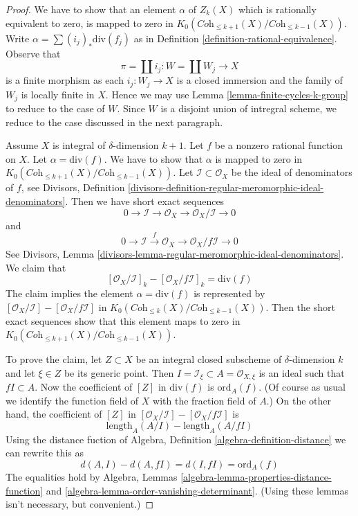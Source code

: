 \begin{proof}
We have to show that an element $\alpha$ of $Z_k(X)$ which is rationally
equivalent to zero, is mapped to zero in
$K_0(\textit{Coh}_{\leq k + 1}(X)/\textit{Coh}_{\leq k - 1}(X))$.
Write $\alpha = \sum (i_j)_*\text{div}(f_j)$ as in
Definition \ref{definition-rational-equivalence}.
Observe that
$$
\pi = \coprod i_j : W = \coprod W_j \longrightarrow X
$$
is a finite morphism as each $i_j : W_j \to X$ is a closed immersion
and the family of $W_j$ is locally finite in $X$. Hence we may use
Lemma \ref{lemma-finite-cycles-k-group} to reduce to the case of $W$.
Since $W$ is a disjoint union of intregral scheme, we reduce
to the case discussed in the next paragraph.

\medskip\noindent
Assume $X$ is integral of $\delta$-dimension $k + 1$.
Let $f$ be a nonzero rational function on $X$.
Let $\alpha = \text{div}(f)$. We have to show that
$\alpha$ is mapped to zero in
$K_0(\textit{Coh}_{\leq k + 1}(X)/\textit{Coh}_{\leq k - 1}(X))$.
Let $\mathcal{I} \subset \mathcal{O}_X$ be the ideal of denominators
of $f$, see Divisors, Definition
\ref{divisors-definition-regular-meromorphic-ideal-denominators}.
Then we have short exact sequences
$$
0 \to \mathcal{I} \to \mathcal{O}_X \to \mathcal{O}_X/\mathcal{I} \to 0
$$
and
$$
0 \to \mathcal{I} \xrightarrow{f} \mathcal{O}_X \to
\mathcal{O}_X/f\mathcal{I} \to 0
$$
See Divisors, Lemma
\ref{divisors-lemma-regular-meromorphic-ideal-denominators}.
We claim that
$$
[\mathcal{O}_X/\mathcal{I}]_k - [\mathcal{O}_X/f\mathcal{I}]_k =
\text{div}(f)
$$
The claim implies the element $\alpha = \text{div}(f)$ is represented by
$[\mathcal{O}_X/\mathcal{I}] - [\mathcal{O}_X/f\mathcal{I}]$
in $K_0(\textit{Coh}_{\leq k}(X)/\textit{Coh}_{\leq k - 1}(X))$.
Then the short exact sequences show that this element maps to
zero in $K_0(\textit{Coh}_{\leq k + 1}(X)/\textit{Coh}_{\leq k - 1}(X))$.

\medskip\noindent
To prove the claim, let $Z \subset X$ be an integral closed subscheme
of $\delta$-dimension $k$ and let $\xi \in Z$ be its generic point.
Then $I = \mathcal{I}_\xi \subset A = \mathcal{O}_{X, \xi}$
is an ideal such that $fI \subset A$. Now the coefficient of
$[Z]$ in $\text{div}(f)$ is $\text{ord}_A(f)$. (Of course as usual
we identify the function field of $X$ with the fraction field of $A$.)
On the other hand, the coefficient of $[Z]$ in
$[\mathcal{O}_X/\mathcal{I}] - [\mathcal{O}_X/f\mathcal{I}]$
is
$$
\text{length}_A(A/I) - \text{length}_A(A/fI)
$$
Using the distance fuction of
Algebra, Definition \ref{algebra-definition-distance}
we can rewrite this as
$$
d(A, I) - d(A, fI) = d(I, fI) = \text{ord}_A(f)
$$
The equalities hold by Algebra, Lemmas
\ref{algebra-lemma-properties-distance-function} and
\ref{algebra-lemma-order-vanishing-determinant}.
(Using these lemmas isn't necessary, but convenient.)
\end{proof}


